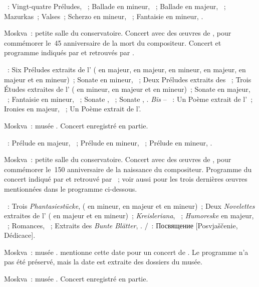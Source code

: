 \begin{description}
 \textsc{\Chopin{}}~: Vingt-quatre Préludes, ~; Ballade 
 en \kG mineur, ~; Ballade  en \kA \Flat majeur,
 ~; Mazurkas~; Valses~; Scherzo  en \kB mineur,
 ~; Fantaisie en \kF mineur, .
 \item[\DateWithWeekDay{1960-05-29}]
 Moskva~: petite salle du conservatoire.
 Concert avec des œuvres de \Scriabine{}, pour commémorer le~45\ieme{}
 anniversaire de la mort du compositeur.
 Concert et programme indiqués par \citet[p.~185]{Nekrasova08} et retrouvés
 par \citet{TADGO1960}.

 \textsc{\Scriabine{}}~: Six Préludes extraits de l' ( en
 \kC majeur,  en \kG majeur,  en \kB mineur, 
 en \kA majeur,  en \kE majeur et  en \kG \Sharp
 mineur)~; Sonate  en \kF \Sharp mineur, ~; Deux Préludes
 extraits des ~; Trois Études extraites de l'
 ( en \kF \Sharp mineur,  en \kF \Sharp majeur et
  en \kC \Sharp mineur)~; Sonate  en \kF \Sharp majeur,
 ~; Fantaisie en \kB mineur, ~; Sonate ,
 ~; Sonate , .
 \emph{Bis} -- \textsc{\Scriabine{}}~: Un Poème extrait de l'~;
 Ironies en \kC majeur,  ~; Un Poème extrait de
 l'.
 \item[\DateWithWeekDay{1960-06-18}]
 Moskva~: musée \Scriabine{}.
 Concert enregistré en partie.

 \textsc{\Scriabine{}}~: Prélude en \kE majeur,  ~;
 Prélude en \kC \Sharp mineur,  ~; Prélude en \kG \Sharp
 mineur,  .
 \item[\DateWithWeekDay{1960-06-19}]
 Moskva~: petite salle du conservatoire.
 Concert avec des œuvres de \Schumann{}, pour commémorer le~150\ieme{}
 anniversaire de la naissance du compositeur.
 Programme du concert indiqué par \citet[p.~185]{Nekrasova08} et retrouvé
 par \citet{TADGO1960}~; voir aussi \citet[p.~387]{Shiryaeva} pour les trois
 dernières œuvres mentionnées dans le programme ci-dessous.

 \textsc{\Schumann{}}~: Trois \emph{Phantasiestücke},  (
 en \kC mineur,  en \kA \Flat majeur et  en \kC
 mineur)~; Deux \emph{Novelettes} extraites de l' ( en
 \kF majeur et  en \kF \Sharp mineur)~; \emph{Kreisleriana},
 ~; \emph{Humoreske} en \kB \Flat majeur, ~; Romances,
 ~; Extraits des \emph{Bunte Blätter}, .
 \textsc{\Schumann{}/\Liszt{}}~: \foreignlanguage{russian}{Посвящение}
 [Posvjaščenie, Dédicace].
 \item[\DateWithWeekDay{1960-06-28}]
 Moskva~: musée \Scriabine{}.
 \citet[p.~185]{Nekrasova08} mentionne cette date pour un concert de
 \VSofronitsky{}.
 Le programme n'a pas été préservé, mais la date est extraite des dossiers
 du musée.
 \item[\DateWithWeekDay{1960-07-12}]
 Moskva~: musée \Scriabine{}.
 Concert enregistré en partie.


\end{description}
